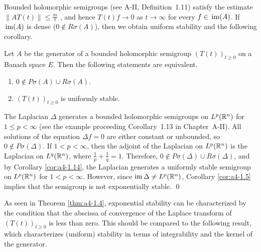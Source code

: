 Bounded holomorphic semigroups (see A-II, Definition~1.11) satisfy the estimate
$\|AT(t)\| \leq \frac{m}{t}$ \citet[p.33]{goldstein:1985a}, and hence $T(t)f \to 0$ as $t \to \infty$
for every $f \in \mathop{}\mathrm{im}(A)$. 
If $\mathop{}\mathrm{im}(A)$ is dense (\ie $0 \not\in R\sigma(A)$), then we obtain
uniform stability and the following corollary.
\begin{corollary}\label{cor:a4-1.14}
Let $A$ be the generator of a bounded holomorphic
semigroup $(T(t))_{t \geq 0}$ on a Banach space $E$. 
Then the following statements are equivalent.
\begin{enumerate}[\upshape (a)]
\item 
$0 \not\in P\sigma(A) \cup R\sigma(A)$.

\item 
$(T(t))_{t \geq 0}$ is uniformly stable.

\end{enumerate}
\end{corollary}
\begin{example}\label{ex:a4-15}
The Laplacian $\Delta$ generates a bounded holomorphic semigroups on $L^{p}(\mathbb{R}^{n})$ for $1 \leq p < \infty$ (see the example proceeding
Corollary~1.13 in Chapter~A-II). 
All solutions of the equation $\Delta f = 0$ are either constant
or unbounded, so $0 \not\in P\sigma(\Delta)$. 
If $1 < p < \infty$, then the adjoint
of the Laplacian on $L^{p}(\mathbb{R}^{n})$ is the Laplacian on $L^{q}(\mathbb{R}^{n})$, where
$\frac{1}{p} + \frac{1}{q} = 1$. 
Therefore, $0 \not\in P\sigma(\Delta) \cup R\sigma(\Delta)$, and by Corollary \ref{cor:a4-1.14},
the Laplacian generates a uniformly stable semigroup on  $L^{p}(\mathbb{R}^{n})$
for $1 < p < \infty$. However, since $\mathop{}\!\mathrm{im}\, \Delta \not= L^{p}(\mathbb{R}^{n})$, Corollary \ref{cor:a4-1.5} implies that the semigroup is not exponentially stable. \qed
\end{example}
As seen in Theorem \ref{thm:a4-1.4}, exponential stability can be characterized by the condition that the abscissa of convergence of the Laplace transform of $(T(t))_{t \geq 0}$ is less than zero. 
This should be compared to the following result, which characterizes (uniform) stability in terms of integrability and the kernel of the generator.
